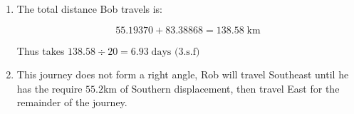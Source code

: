 \documentclass{article}
\begin{document}
\begin{enumerate}

We see this sets up a right angled-triangle and so by right angled trigonometry, the distance travelled South is:

$$
100 \cdot \cos (56.5^\circ) = 55.19370 \; \text{km} \quad \text{(nearest cm)}
$$
and the distance travelled East is :
$$
100 \cdot \sin (56.5^\circ) = 83.38868 \; \text{km} \quad \text{(nearest cm)}
$$

\item The total distance Bob travels is:

$$
55.19370+83.38868=138.58 \; \text{km}
$$

Thus takes $138.58 \div 20 = 6.93 \; \text{days  (3.s.f)} $

\item This journey does not form a right angle, Rob will travel Southeast until he has the require $55.2$km of Southern displacement, then travel East for the remainder of the journey.

\begin{tikzpicture}[scale=1, >=stealth]


\end{tikzpicture}
\end{enumerate}
\end{document}
